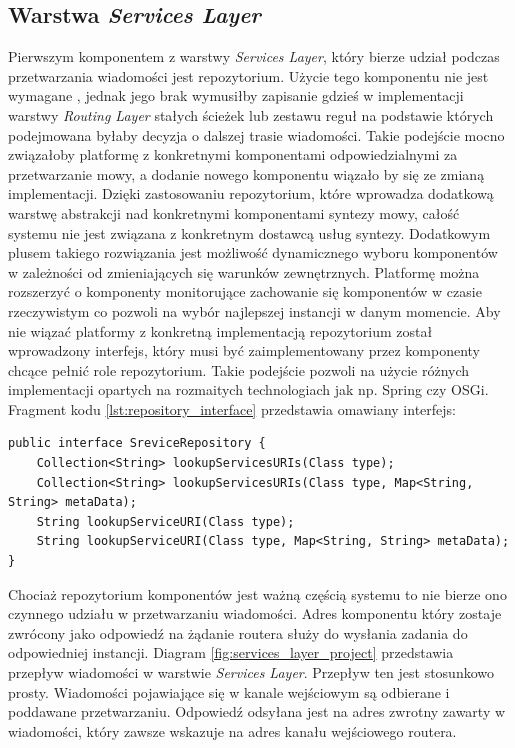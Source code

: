 \subsection{Warstwa \textit{Services Layer}}

Pierwszym komponentem z warstwy \textit{Services Layer}, który bierze udział podczas przetwarzania wiadomości jest repozytorium. Użycie tego komponentu nie jest wymagane , jednak jego brak wymusiłby zapisanie gdzieś w implementacji warstwy \textit{Routing Layer} stałych ścieżek lub zestawu reguł na podstawie których podejmowana byłaby decyzja o dalszej trasie wiadomości. Takie podejście mocno związałoby platformę z konkretnymi komponentami odpowiedzialnymi za przetwarzanie mowy, a dodanie nowego komponentu wiązało by się ze zmianą implementacji. Dzięki zastosowaniu repozytorium, które wprowadza dodatkową warstwę abstrakcji nad konkretnymi komponentami syntezy mowy, całość systemu nie jest związana z konkretnym dostawcą usług syntezy. Dodatkowym plusem takiego rozwiązania jest możliwość dynamicznego wyboru komponentów w zależności od zmieniających się warunków zewnętrznych. Platformę można rozszerzyć o komponenty monitorujące zachowanie się komponentów w czasie rzeczywistym co pozwoli na wybór najlepszej instancji w danym momencie. 
Aby nie wiązać platformy z konkretną implementacją repozytorium został wprowadzony interfejs, który musi być zaimplementowany przez komponenty chcące pełnić role repozytorium. Takie podejście pozwoli na użycie różnych implementacji opartych na rozmaitych technologiach jak np. Spring czy OSGi. Fragment kodu \ref{lst:repository_interface} przedstawia omawiany interfejs:

\lstset{language=Java, tabsize=4, caption=Definicja interfejsu ISreviceRepository w języku Java.,label=lst:repository_interface}

\begin{center}
\begin{lstlisting}
public interface SreviceRepository {
	Collection<String> lookupServicesURIs(Class type);
	Collection<String> lookupServicesURIs(Class type, Map<String, String> metaData);
	String lookupServiceURI(Class type);
	String lookupServiceURI(Class type, Map<String, String> metaData);
}
\end{lstlisting}
\end{center}

Chociaż repozytorium komponentów jest ważną częścią systemu to nie bierze ono czynnego udziału w przetwarzaniu wiadomości. Adres komponentu który zostaje zwrócony jako odpowiedź na żądanie routera służy do wysłania zadania do odpowiedniej instancji. Diagram \ref{fig:services_layer_project} przedstawia przepływ wiadomości w warstwie \textit{Services Layer}. Przepływ ten jest stosunkowo prosty. Wiadomości pojawiające się w kanale wejściowym są odbierane i poddawane przetwarzaniu. Odpowiedź odsyłana jest na adres zwrotny zawarty w wiadomości, który zawsze wskazuje na adres kanału wejściowego routera. 

